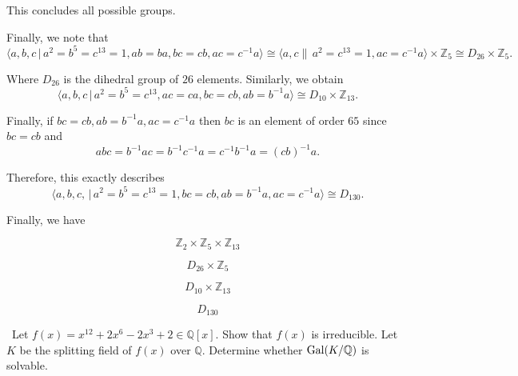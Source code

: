 \documentclass[12pt]{AlgebraQual}
\begin{document}
\begin{solution}
This concludes all possible groups.

Finally, we note that
    $$\langle a,b,c\,|\,a^2=b^5=c^{13}=1,ab=ba,bc=cb,ac=c^{-1}a\rangle\cong\langle a,c\|\,a^2=c^{13}=1,ac=c^{-1}a\rangle\times\mathbb{Z}_5\cong D_{26}\times\mathbb{Z}_5.$$

    Where $D_{26}$ is the dihedral group of $26$ elements. Similarly, we obtain   $$\langle a,b,c\,|\,a^2=b^5=c^{13},ac=ca,bc=cb,ab=b^{-1}a\rangle\cong D_{10}\times\mathbb{Z}_{13}.$$

    Finally, if $bc=cb,ab=b^{-1}a,ac=c^{-1}a$ then $bc$ is an element of order $65$ since $bc=cb$ and $$abc=b^{-1}ac=b^{-1}c^{-1}a=c^{-1}b^{-1}a=(cb)^{-1}a.$$

    Therefore, this exactly describes $$\langle a,b,c,\,|\,a^2=b^5=c^{13}=1,bc=cb,ab=b^{-1}a,ac=c^{-1}a\rangle\cong D_{130}.$$

    Finally, we have

\begin{center}
    \begin{framed}

    $$\mathbb{Z}_2\times\mathbb{Z}_5\times\mathbb{Z}_{13}$$

    $$D_{26}\times\mathbb{Z}_5$$

    $$D_{10}\times\mathbb{Z}_{13}$$

    $$D_{130}$$

    \end{framed}
\end{center}

\end{solution}
\newpage



\begin{problem} $\,$
Let $f(x)=x^{12}+2x^6-2x^3+2\in\mathbb{Q}[x]$. Show that $f(x)$ is irreducible. Let $K$ be the splitting field of $f(x)$ over $\mathbb{Q}$. Determine whether $\text{Gal}(K/\mathbb{Q})$ is solvable.
\end{problem}
\end{document}
